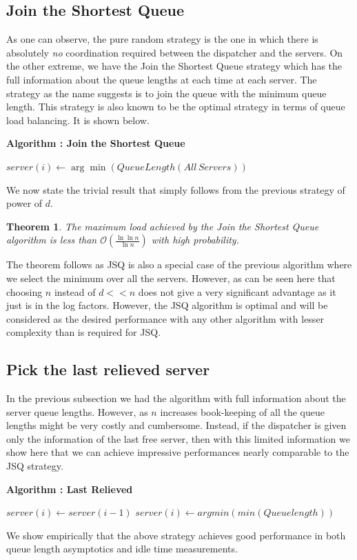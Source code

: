 \documentclass[a4paper,english,11pt]{article}
\newtheorem{theorem}{Theorem}
\begin{document}
\subsection{Join the Shortest Queue}
As one can observe, the pure random strategy is the one in which there is absolutely \textit{no} coordination required between the dispatcher and the servers. On the other extreme, we have the Join the Shortest Queue strategy which has the full information about the queue lengths at each time at each server. The strategy as the name suggests is to join the queue with the minimum queue length. This strategy is also known to be the optimal strategy in terms of queue load balancing. It is shown below.  
\begin{algorithm}
\textbf{{Algorithm : Join the Shortest Queue}}\label{euclid3}
\begin{algorithmic}[1]
\State $server(i) \gets \arg\min(QueueLength(All\,Servers))$
\EndFor
\State \Return 
\end{algorithmic}
\end{algorithm}
We now state the trivial result that simply follows from the previous strategy of power of $d$. 
\begin{theorem}
The maximum load achieved by the Join the Shortest Queue algorithm is less than $\mathcal{O}(\frac{\ln \ln n}{\ln n})$ with high probability.
\end{theorem}
The theorem follows as JSQ is also a special case of the previous algorithm where we select the minimum over all the servers. However, as can be seen here that choosing $n$ instead of $d<<n$ does not give a very significant advantage as it just is in the log factors. However, the JSQ algorithm is optimal and will be considered as the desired performance with any other algorithm with lesser complexity than is required for JSQ.
\subsection{Pick the last relieved server}

In the previous subsection we had the algorithm with full information about the server queue lengths. However, as $n$ increases book-keeping of all the queue lengths might be very costly and cumbersome. Instead, if the dispatcher is given only the information of the last free server, then with this limited information we show here that we can achieve impressive performances nearly comparable to the JSQ strategy.
\begin{algorithm}
\textbf{{Algorithm : Last Relieved}}\label{euclid4}
\begin{algorithmic}[1]
\State $ server(i) \gets server(i-1) $
\Else
\State $ server(i) \gets argmin (min(Queuelength)) $
\EndIf
\EndFor
\State \Return 
\end{algorithmic}
\end{algorithm}
We show empirically that the above strategy achieves good performance in both queue length asymptotics and idle time measurements.
\end{document}
